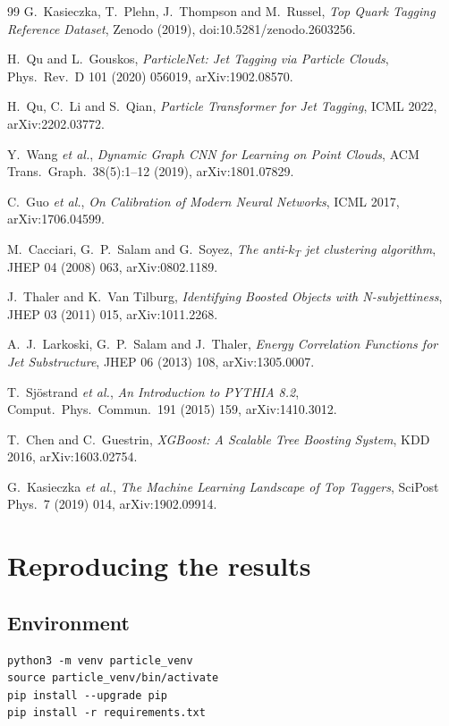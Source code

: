 \documentclass[12pt,a4paper,oneside]{report}
\begin{document}
\begin{thebibliography}{99}
G.\ Kasieczka, T.\ Plehn, J.\ Thompson and M.\ Russel,
\emph{Top Quark Tagging Reference Dataset},
Zenodo (2019), doi:10.5281/zenodo.2603256.

H.\ Qu and L.\ Gouskos, \emph{ParticleNet: Jet Tagging via Particle
Clouds}, Phys.\ Rev.\ D 101 (2020) 056019, arXiv:1902.08570.

H.\ Qu, C.\ Li and S.\ Qian, \emph{Particle Transformer for Jet
Tagging}, ICML 2022, arXiv:2202.03772.

Y.\ Wang \emph{et al.}, \emph{Dynamic Graph CNN for Learning on
Point Clouds}, ACM Trans.\ Graph.\ 38(5):1--12 (2019),
arXiv:1801.07829.

C.\ Guo \emph{et al.}, \emph{On Calibration of Modern Neural
Networks}, ICML 2017, arXiv:1706.04599.

M.\ Cacciari, G.\ P.\ Salam and G.\ Soyez, \emph{The anti-$k_T$ jet
clustering algorithm}, JHEP 04 (2008) 063, arXiv:0802.1189.

J.\ Thaler and K.\ Van Tilburg, \emph{Identifying Boosted Objects
with N-subjettiness}, JHEP 03 (2011) 015, arXiv:1011.2268.

A.\ J.\ Larkoski, G.\ P.\ Salam and J.\ Thaler, \emph{Energy
Correlation Functions for Jet Substructure}, JHEP 06 (2013) 108,
arXiv:1305.0007.

T.\ Sjöstrand \emph{et al.}, \emph{An Introduction to PYTHIA 8.2},
Comput.\ Phys.\ Commun.\ 191 (2015) 159, arXiv:1410.3012.

T.\ Chen and C.\ Guestrin, \emph{XGBoost: A Scalable Tree Boosting
System}, KDD 2016, arXiv:1603.02754.

G.\ Kasieczka \emph{et al.}, \emph{The Machine Learning Landscape
of Top Taggers}, SciPost Phys.\ 7 (2019) 014, arXiv:1902.09914.
\end{thebibliography}

\appendix
\chapter{Reproducing the results}\label{app:repro}
\section{Environment}
\begin{verbatim}
python3 -m venv particle_venv
source particle_venv/bin/activate
pip install --upgrade pip
pip install -r requirements.txt
\end{verbatim}
\end{document}
